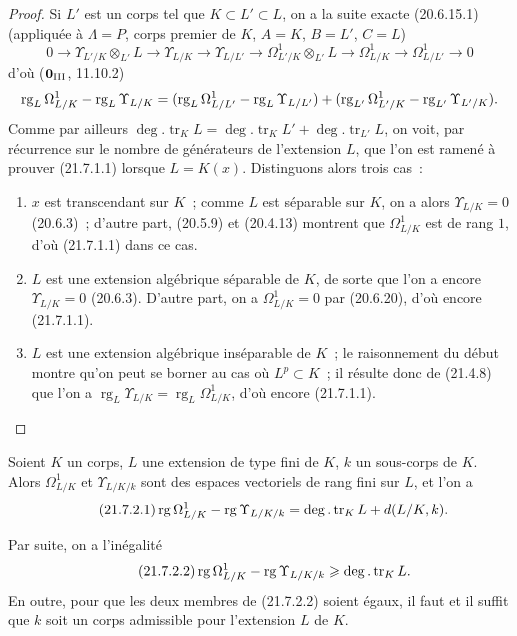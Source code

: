 \begin{proof}
Si $L'$ est un corps tel que $K\subset L'\subset L$, on a la suite exacte
(20.6.15.1) (appliquée à $\Lambda=P$, corps premier de $K$, $A=K$,
$B=L'$, $C=L$)
\[
0\to\Upsilon_{L'/K}\otimes_{L'}L\to\Upsilon_{L/K}\to\Upsilon_{L/L'}
\to\Omega^1_{L'/K}\otimes_{L'}L\to\Omega^1_{L/K}
\to\Omega^1_{L/L'}\to0
\]
d'où ($\mathbf{0}_{\rm III}$, 11.10.2)
\[
\operatorname{rg}_L\Omega^1_{L/K}-\operatorname{rg}_L\Upsilon_{L/K}
=(\operatorname{rg}_L\Omega^1_{L/L'}-\operatorname{rg}_L\Upsilon_{L/L'})
+(\operatorname{rg}_{L'}\Omega^1_{L'/K}-\operatorname{rg}_{L'}\Upsilon_{L'/K}).
\]
Comme par ailleurs $\deg.\operatorname{tr}_K L=\deg.\operatorname{tr}_K L'
+\deg.\operatorname{tr}_{L'}L$, on voit, par récurrence sur le nombre de
générateurs de l'extension $L$, que l'on est ramené à prouver (21.7.1.1)
lorsque $L=K(x)$. Distinguons alors trois cas~:
\begin{enumerate}
  \item[\textit{a)}] $x$ est transcendant sur $K$~; comme $L$ est séparable sur
  $K$, on a alors $\Upsilon_{L/K}=0$ (20.6.3)~; d'autre part, (20.5.9) et
  (20.4.13) montrent que $\Omega^1_{L/K}$ est de rang $1$, d'où
  (21.7.1.1) dans ce cas.
  \item[\textit{b)}] $L$ est une extension algébrique séparable de $K$, de sorte
  que l'on a encore $\Upsilon_{L/K}=0$ (20.6.3). D'autre part, on a
  $\Omega^1_{L/K}=0$ par (20.6.20), d'où encore (21.7.1.1).
  \item[\textit{c)}] $L$ est une extension algébrique inséparable de $K$~; le
  raisonnement du début montre qu'on peut se borner au cas où $L^p\subset K$~;
  il résulte donc de (21.4.8) que l'on a
  $\operatorname{rg}_L\Upsilon_{L/K}=\operatorname{rg}_L\Omega^1_{L/K}$,
  d'où encore (21.7.1.1).
\end{enumerate}
\end{proof}

\begin{corollary}[21.7.2]
\label{0.21.7.2-fr}
Soient $K$ un corps, $L$ une extension de type fini de $K$, $k$ un sous-corps
de $K$. Alors $\Omega^1_{L/K}$ et $\Upsilon_{L/K/k}$ sont des espaces
vectoriels de rang fini sur $L$, et l'on a
\begin{equation}
\tag{21.7.2.1}
\label{0.21.7.2.1-fr}
\operatorname{rg}\Omega^1_{L/K}-\operatorname{rg}\Upsilon_{L/K/k}
=\deg.\operatorname{tr}_K L+d(L/K,k).
\end{equation}

Par suite, on a l'inégalité
\begin{equation}
\tag{21.7.2.2}
\label{0.21.7.2.2-fr}
\operatorname{rg}\Omega^1_{L/K}-\operatorname{rg}\Upsilon_{L/K/k}
\geqslant\deg.\operatorname{tr}_K L.
\end{equation}
En outre, pour que les deux membres de \textup{(21.7.2.2)} soient égaux, il faut et
il suffit que $k$ soit un corps admissible pour l'extension $L$ de $K$.
\end{corollary}

